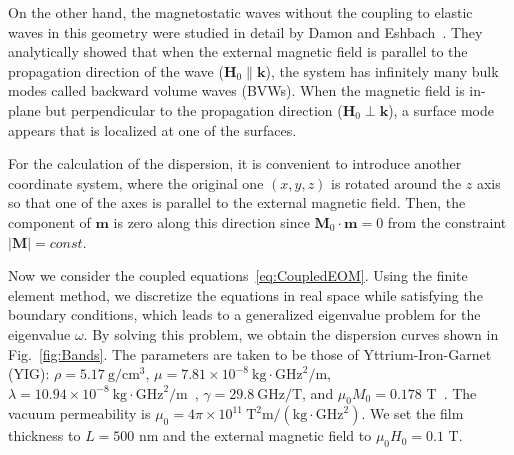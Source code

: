 \documentclass[aps,prb,10pt,amsmath,amssymb,twocolumn,longbibliography,superscriptaddress]{revtex4-2}
\begin{document}
On the other hand, the magnetostatic waves without the coupling to elastic waves in this geometry were studied in detail by Damon and Eshbach~\cite{damoneshbachMagnetostaticModesFerromagnet1961}. They analytically showed that when the external magnetic field is parallel to the propagation direction of the wave ($\bm{H}_0\parallel\bm{k}$), the system has infinitely many bulk modes called backward volume waves (BVWs). When the magnetic field is in-plane but perpendicular to the propagation direction ($\bm{H}_0\perp\bm{k}$), a surface mode appears that is localized at one of the surfaces.

For the calculation of the dispersion, it is convenient to introduce another coordinate system, where the original one $(x,y,z)$ is rotated around the $z$ axis so that one of the axes is parallel to the external magnetic field. Then, the component of $\bm{m}$ is zero along this direction since $\bm{M}_0\cdot\bm{m}=0$ from the constraint $|\bm{M}|=const.$

Now we consider the coupled equations~\eqref{eq:CoupledEOM}. Using the finite element method, we discretize the equations in real space while satisfying the boundary conditions, which leads to a generalized eigenvalue problem for the eigenvalue $\omega$. By solving this problem, we obtain the dispersion curves shown in Fig.~\ref{fig:Bands}. The parameters are taken to be those of Yttrium-Iron-Garnet (YIG): $\rho=5.17\ \mathrm{g}/\mathrm{cm}^3$, $\mu=7.81\times10^{-8}\ \mathrm{kg}\cdot\mathrm{GHz}^2/\mathrm{m}$, $\lambda=10.94\times10^{-8}\ \mathrm{kg}\cdot\mathrm{GHz}^2/\mathrm{m}$~\cite{clarkElasticConstantsSingleCrystal1961}, $\gamma=29.8\ \mathrm{GHz}/\mathrm{T}$, and $\mu_0M_0=0.178$ T~\cite{AulockHandbookofferritematerials}. The vacuum permeability is $\mu_0=4\pi\times10^{11}\ \mathrm{T}^2\mathrm{m}/(\mathrm{kg}\cdot\mathrm{GHz}^2)$. We set the film thickness to $L=500$ nm and the external magnetic field to $\mu_0H_0=0.1$ T.
\end{document}
